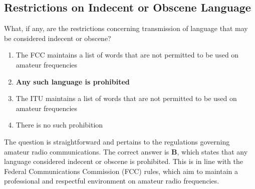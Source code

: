 \subsection{Restrictions on Indecent or Obscene Language}
\label{T1D06}

\begin{tcolorbox}[colback=gray!10!white,colframe=black!75!black,title=T1D06]
What, if any, are the restrictions concerning transmission of language that may be considered indecent or obscene?
\begin{enumerate}[label=\Alph*,noitemsep]
    \item The FCC maintains a list of words that are not permitted to be used on amateur frequencies
    \item \textbf{Any such language is prohibited}
    \item The ITU maintains a list of words that are not permitted to be used on amateur frequencies
    \item There is no such prohibition
\end{enumerate}
\end{tcolorbox}

The question is straightforward and pertains to the regulations governing amateur radio communications. The correct answer is \textbf{B}, which states that any language considered indecent or obscene is prohibited. This is in line with the Federal Communications Commission (FCC) rules, which aim to maintain a professional and respectful environment on amateur radio frequencies.
